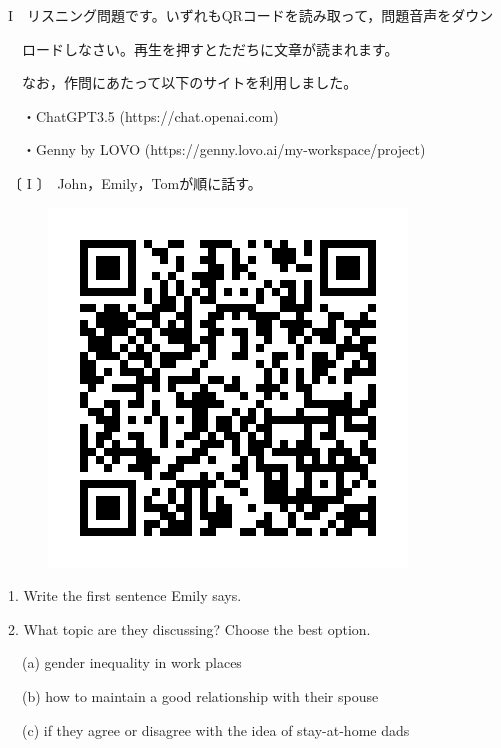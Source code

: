 \documentclass[12pt,a4paper,dvipdfmx]{jarticle}
\begin{document}
\setcounter{page}{1}

\begin{spacing}{1.5}


{\Large\textbf{$\mathrm{I}$}}　リスニング問題です。いずれもQRコードを読み取って，問題音声をダウン

　ロードしなさい。再生を押すとただちに文章が読まれます。

　なお，作問にあたって以下のサイトを利用しました。

　・ChatGPT3.5 (https://chat.openai.com)

　・Genny by LOVO (https://genny.lovo.ai/my-workspace/project)



\vspace{7mm}

〔 $\mathrm{I}$ 〕　John，Emily，Tomが順に話す。

\vspace{3mm}
\begin{figure}[H]
\centering
\includegraphics[scale=0.2]{conversation.jpeg}
\end{figure}
\vspace{-1mm}

1. Write the first sentence Emily says.

2. What topic are they discussing? Choose the best option.

　(a) gender inequality in work places

　(b) how to maintain a good relationship with their spouse

　(c) if they agree or disagree with the idea of stay-at-home dads


\end{spacing}
\end{document}
